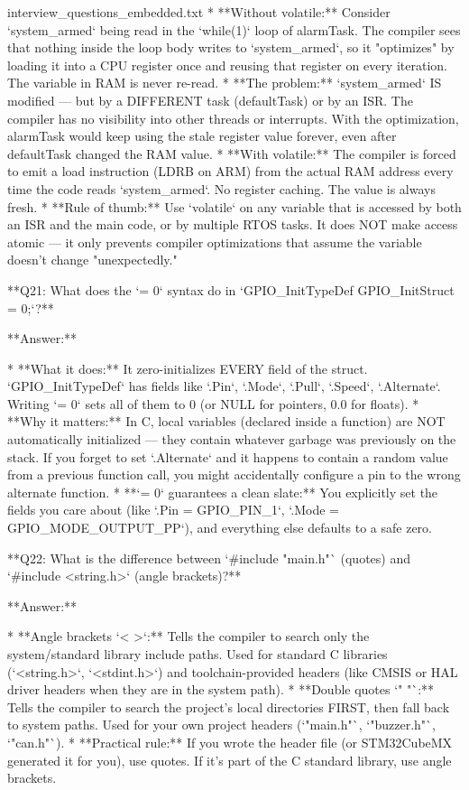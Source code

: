 \begin{filecontents*}{interview_questions_embedded.txt}
* **Without volatile:** Consider `system_armed` being read in the `while(1)` loop of alarmTask. The compiler sees that nothing inside the loop body writes to `system_armed`, so it "optimizes" by loading it into a CPU register once and reusing that register on every iteration. The variable in RAM is never re-read.
* **The problem:** `system_armed` IS modified — but by a DIFFERENT task (defaultTask) or by an ISR. The compiler has no visibility into other threads or interrupts. With the optimization, alarmTask would keep using the stale register value forever, even after defaultTask changed the RAM value.
* **With volatile:** The compiler is forced to emit a load instruction (LDRB on ARM) from the actual RAM address every time the code reads `system_armed`. No register caching. The value is always fresh.
* **Rule of thumb:** Use `volatile` on any variable that is accessed by both an ISR and the main code, or by multiple RTOS tasks. It does NOT make access atomic — it only prevents compiler optimizations that assume the variable doesn't change "unexpectedly."

**Q21: What does the `= {0}` syntax do in `GPIO_InitTypeDef GPIO_InitStruct = {0};`?**

**Answer:**

* **What it does:** It zero-initializes EVERY field of the struct. `GPIO_InitTypeDef` has fields like `.Pin`, `.Mode`, `.Pull`, `.Speed`, `.Alternate`. Writing `= {0}` sets all of them to 0 (or NULL for pointers, 0.0 for floats).
* **Why it matters:** In C, local variables (declared inside a function) are NOT automatically initialized — they contain whatever garbage was previously on the stack. If you forget to set `.Alternate` and it happens to contain a random value from a previous function call, you might accidentally configure a pin to the wrong alternate function.
* **`= {0}` guarantees a clean slate:** You explicitly set the fields you care about (like `.Pin = GPIO_PIN_1`, `.Mode = GPIO_MODE_OUTPUT_PP`), and everything else defaults to a safe zero.

**Q22: What is the difference between `#include "main.h"` (quotes) and `#include <string.h>` (angle brackets)?**

**Answer:**

* **Angle brackets `< >`:** Tells the compiler to search only the system/standard library include paths. Used for standard C libraries (`<string.h>`, `<stdint.h>`) and toolchain-provided headers (like CMSIS or HAL driver headers when they are in the system path).
* **Double quotes `" "`:** Tells the compiler to search the project's local directories FIRST, then fall back to system paths. Used for your own project headers (`"main.h"`, `"buzzer.h"`, `"can.h"`).
* **Practical rule:** If you wrote the header file (or STM32CubeMX generated it for you), use quotes. If it's part of the C standard library, use angle brackets.


\end{filecontents*}

